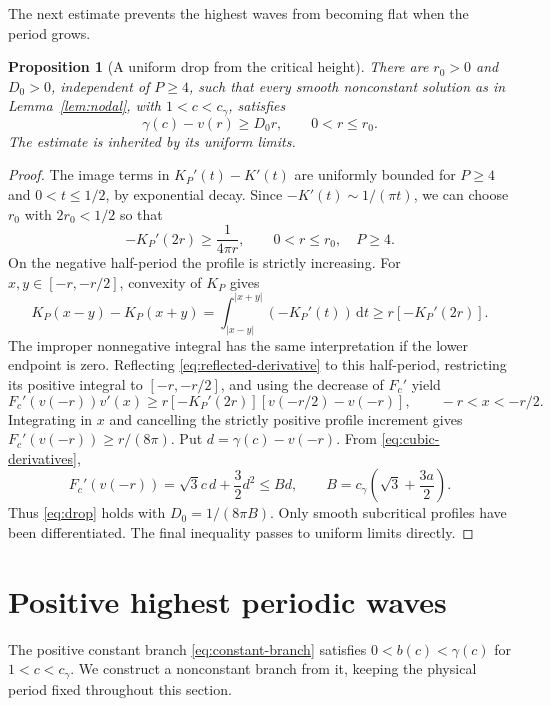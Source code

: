 \documentclass[11pt,a4paper]{article}
\newtheorem{proposition}[theorem]{Proposition}
\theoremstyle{remark}
\newcommand{\cg}{c_\gamma}
\newcommand{\dd}{\,\mathrm d}
\begin{document}
The next estimate prevents the highest waves from becoming flat when the
period grows.
\begin{proposition}[A uniform drop from the critical height]\label{prop:drop}
There are $r_0>0$ and $D_0>0$, independent of $P\ge4$, such that every
smooth nonconstant solution as in Lemma~\ref{lem:nodal}, with
$1<c<\cg$, satisfies
\begin{equation}\label{eq:drop}
 \gamma(c)-v(r)\ge D_0r,\qquad 0<r\le r_0.
\end{equation}
The estimate is inherited by its uniform limits.
\end{proposition}
\begin{proof}
The image terms in $K_P'(t)-K'(t)$ are uniformly bounded for $P\ge4$
and $0<t\le1/2$, by exponential decay. Since $-K'(t)\sim1/(\pi t)$,
we can choose $r_0$ with $2r_0<1/2$ so that
\begin{equation}\label{eq:periodic-derivative-bound}
 -K_P'(2r)\ge\frac1{4\pi r},\qquad 0<r\le r_0,\quad P\ge4.
\end{equation}
On the negative half-period the profile is strictly increasing. For
$x,y\in[-r,-r/2]$, convexity of $K_P$ gives
\[
 K_P(x-y)-K_P(x+y)
   =\int_{|x-y|}^{|x+y|}(-K_P'(t))\dd t
   \ge r[-K_P'(2r)].
\]
The improper nonnegative integral has the same interpretation if the lower
endpoint is zero. Reflecting \eqref{eq:reflected-derivative} to this
half-period, restricting its positive integral to $[-r,-r/2]$, and using
the decrease of $F_c'$ yield
\[
 F_c'(v(-r))v'(x)\ge r[-K_P'(2r)]
                   [v(-r/2)-v(-r)],\qquad -r<x<-r/2.
\]
Integrating in $x$ and cancelling the strictly positive profile increment
gives $F_c'(v(-r))\ge r/(8\pi)$. Put $d=\gamma(c)-v(-r)$. From
\eqref{eq:cubic-derivatives},
\[
 F_c'(v(-r))=\sqrt3c\,d+\frac32d^2
       \le B d,\qquad B=\cg\left(\sqrt3+\frac{3a}{2}\right).
\]
Thus \eqref{eq:drop} holds with $D_0=1/(8\pi B)$. Only smooth
subcritical profiles have been differentiated. The final inequality
passes to uniform limits directly.
\end{proof}

\section{Positive highest periodic waves}\label{sec:periodic}

The positive constant branch \eqref{eq:constant-branch} satisfies
$0<b(c)<\gamma(c)$ for $1<c<\cg$. We construct a nonconstant branch
from it, keeping the physical period fixed throughout this section.
\end{document}
